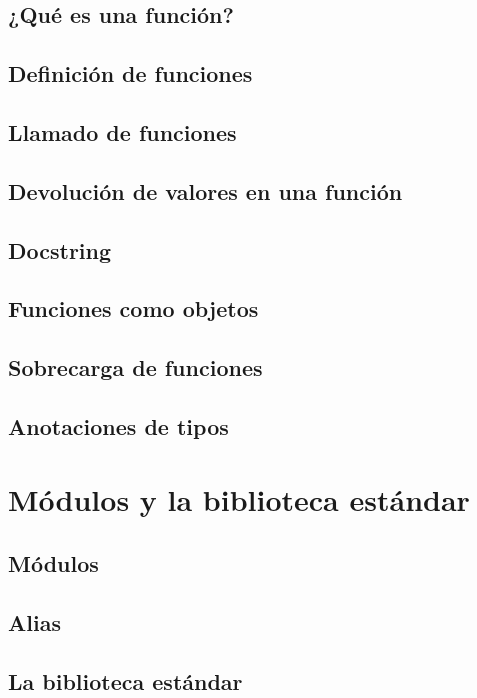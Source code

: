 \documentclass{article}
\begin{document}
\subsection{¿Qué es una función?}

\subsection{Definición de funciones}

\subsection{Llamado de funciones}

\subsection{Devolución de valores en una función}

\subsection{Docstring}

\subsection{Funciones como objetos}

\subsection{Sobrecarga de funciones}

\subsection{Anotaciones de tipos}

\section{Módulos y la biblioteca estándar}

\subsection{Módulos}

\subsection{Alias}

\subsection{La biblioteca estándar}
\end{document}
